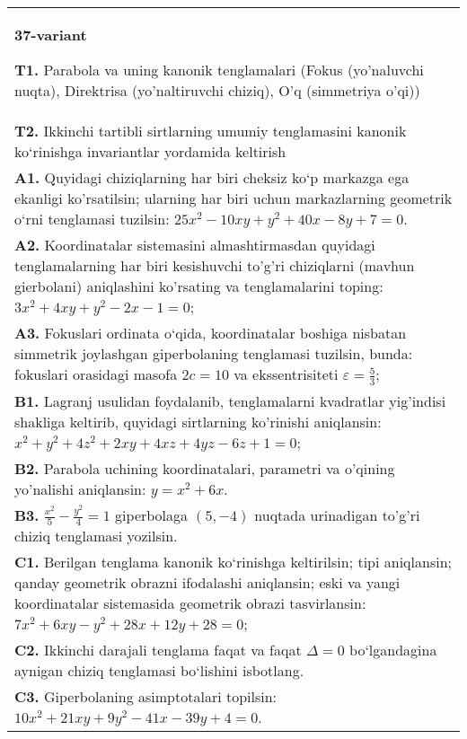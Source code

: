 \documentclass{article}
\begin{document}
\begin{tabular}{m{17cm}}
\textbf{37-variant}
\newline

\textbf{T1.} Parabola va uning kanonik tenglamalari (Fokus (yo’naluvchi nuqta), Direktrisa (yo’naltiruvchi chiziq), O’q (simmetriya o’qi)) \\
\textbf{T2.} Ikkinchi tartibli sirtlarning umumiy tenglamasini kanonik ko‘rinishga invariantlar yordamida keltirish \\
\textbf{A1.} Quyidagi chiziqlarning har biri cheksiz ko‘p markazga ega ekanligi ko'rsatilsin; ularning har biri uchun markazlarning geometrik o‘rni tenglamasi tuzilsin: $25 x^2-10 x y+y^2+40 x-8 y+7=0$. \\
\textbf{A2.} Koordinatalar sistemasini almashtirmasdan quyidagi tenglamalarning har biri kesishuvchi to'g'ri chiziqlarni (mavhun gierbolani) aniqlashini ko'rsating va tenglamalarini toping: $3 x^2+4 x y+y^2-2 x-1=0$; \\
\textbf{A3.} Fokuslari ordinata o‘qida, koordinatalar boshiga nisbatan simmetrik joylashgan giperbolaning tenglamasi tuzilsin, bunda: fokuslari orasidagi masofa $2 c=10$ va ekssentrisiteti $\varepsilon=\frac{5}{3}$; \\
\textbf{B1.} Lagranj usulidan foydalanib, tenglamalarni kvadratlar yig'indisi shakliga keltirib, quyidagi sirtlarning ko'rinishi aniqlansin: $x^2+y^2+4 z^2+2 x y+4 x z+4 y z-6 z+1=0$; \\
\textbf{B2.} Parabola uchining koordinatalari, parametri va o'qining yo'nalishi aniqlansin: $y=x^2+6 x$. \\
\textbf{B3.} $\frac{x^2}{5}-\frac{y^2}{4}=1$ giperbolaga $(5,-4)$ nuqtada urinadigan to'g'ri chiziq tenglamasi yozilsin. \\
\textbf{C1.} Berilgan tenglama kanonik ko‘rinishga keltirilsin; tipi aniqlansin; qanday geometrik obrazni ifodalashi aniqlansin; eski va yangi koordinatalar sistemasida geometrik obrazi tasvirlansin: $7 x^2+6 x y-y^2+28 x+12 y+28=0$; \\
\textbf{C2.} Ikkinchi darajali tenglama faqat va faqat $\Delta=0$ bo‘lgandagina aynigan chiziq tenglamasi bo‘lishini isbotlang. \\
\textbf{C3.} Giperbolaning asimptotalari topilsin: $10 x^2+21 x y+9 y^2-41 x-39 y+4=0$. \\

\end{tabular}
\vspace{1cm}
\end{document}

